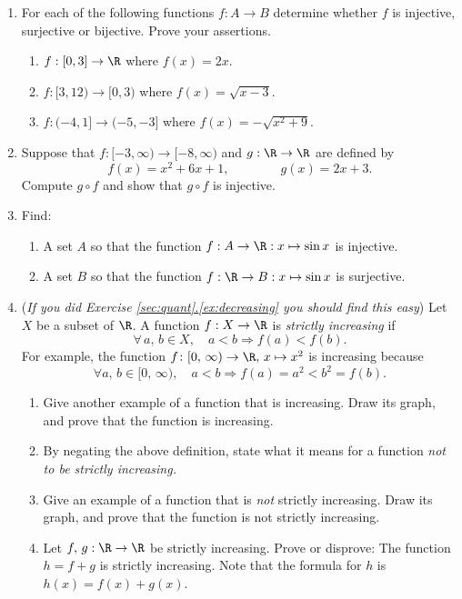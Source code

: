 \begin{enumerate}\renewcommand{\labelenumi}{\thesubsection.\theenumi}
  \item For each of the following functions $f:A\to B$ determine whether $f$ is injective, surjective or bijective. Prove your assertions.
  \begin{enumerate}
    \item $f:[0,3]\to\R$ where $f(x)=2x$.
    \item $f:[3,12)\to[0,3)$ where $f(x)=\sqrt{x-3}$.
    \item $f:(-4,1]\to(-5,-3]$ where $f(x)=-\sqrt{x^2+9}$.
  \end{enumerate}
  
  \item Suppose that $f:[-3,\infty)\to[-8,\infty)$ and $g:\R\to\R$ are defined by
	\[f(x)=x^2+6x+1,\qquad\qquad g(x)=2x+3.\]
	Compute $g\circ f$ and show that $g\circ f$ is injective.
  
  \item Find:
		\begin{enumerate}
			\item A set $A$ so that the function $f:A\to\R:x\mapsto\sin x$ is injective.
			\item A set $B$ so that the function $f:\R\to B:x\mapsto\sin x$ is surjective.
		\end{enumerate}


  \item (\emph{If you did Exercise \hyperref[ex:decreasing]{\ref*{sec:quant}.\ref*{ex:decreasing}} you should find this easy}) Let $X$ be a subset of $\R$. A function $f:X\to\R$ is \emph{strictly increasing} if 
	\[\forall \,a,\, b \in X,\quad a<b \Longrightarrow f(a)<f(b).\]
	For example, the function $f \colon [0,\,\infty)\to \R, \,x \mapsto x^2$  is increasing because 
	\[\forall a,\,b \in  [0,\,\infty) , \quad a<b \Longrightarrow f(a) = a^2< b^2=f(b).\]
		\begin{enumerate}
	  	\item Give another example of a function that is increasing. Draw its graph, and prove that  the function is increasing.  
	  	\item By negating the above definition, state what it means for a function \emph{not to be strictly increasing.} 
	  	\item Give an example of a function that is \emph{not} strictly increasing. Draw its graph, and prove that the function is not strictly increasing.  
	  	\item Let $f,\,g:\R\to\R$ be strictly increasing. Prove or disprove: The function $h=f+g$ is strictly increasing. Note that the formula for $h$ is $h(x)=f(x)+g(x)$.
		\end{enumerate}	
		

\end{enumerate}
